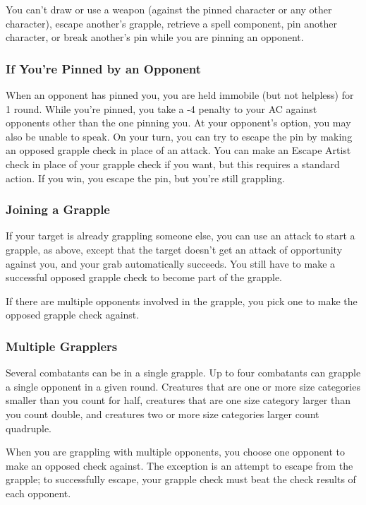 You can't draw or use a weapon (against the pinned character or any other character), 
escape another's grapple, retrieve a spell component, pin another character, or 
break another's pin while you are pinning an opponent.

\subsubsection{If You're Pinned by an Opponent}

When an opponent has pinned you, you are held immobile (but not helpless) for 1 
round. While you're pinned, you take a -4 penalty to your AC against opponents 
other than the one pinning you. At your opponent's option, you may also be unable 
to speak. On your turn, you can try to escape the pin by making an opposed grapple 
check in place of an attack. You can make an Escape Artist check in place of your 
grapple check if you want, but this requires a standard action. If you win, you 
escape the pin, but you're still grappling.

\subsubsection{Joining a Grapple}

If your target is already grappling someone else, you can use an attack to start 
a grapple, as above, except that the target doesn't get an attack of opportunity 
against you, and your grab automatically succeeds. You still have to make a successful 
opposed grapple check to become part of the grapple.

If there are multiple opponents involved in the grapple, you pick one to make the 
opposed grapple check against.

\subsubsection{Multiple Grapplers}

Several combatants can be in a single grapple. Up to four combatants can grapple 
a single opponent in a given round. Creatures that are one or more size categories 
smaller than you count for half, creatures that are one size category larger than 
you count double, and creatures two or more size categories larger count quadruple.

When you are grappling with multiple opponents, you choose one opponent to make 
an opposed check against. The exception is an attempt to escape from the grapple; 
to successfully escape, your grapple check must beat the check results of each 
opponent.

